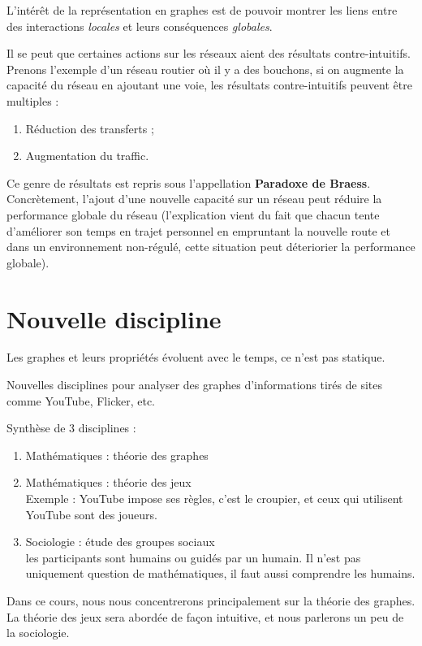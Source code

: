 L'intérêt de la représentation en graphes est de pouvoir montrer les
liens entre des interactions \textit{locales} et leurs conséquences
\textit{globales}. \newline

Il se peut que certaines actions sur les réseaux aient des résultats
contre-intuitifs. Prenons l'exemple d'un réseau routier où il y a des
bouchons, si on augmente la capacité du réseau en ajoutant une voie, les
résultats contre-intuitifs peuvent être multiples :

\begin{enumerate}
    \item Réduction des transferts ;
    \item Augmentation du traffic.
\end{enumerate}

Ce genre de résultats est repris sous l'appellation \textbf{Paradoxe de
Braess}. Concrètement, l'ajout d'une nouvelle capacité sur un réseau
peut réduire la performance globale du réseau (l'explication vient du
fait que chacun tente d'améliorer son temps en trajet personnel en
empruntant la nouvelle route et dans un environnement non-régulé, cette
situation peut déteriorier la performance globale).

\section{Nouvelle discipline}
Les graphes et leurs propriétés évoluent avec le temps, ce n'est pas statique.

Nouvelles disciplines pour analyser des graphes d'informations tirés de sites comme YouTube, Flicker, etc.

Synthèse de 3 disciplines :
\begin{enumerate}

	\item Mathématiques : théorie des graphes
	\item Mathématiques : théorie des jeux\\
		Exemple : YouTube impose ses règles, c'est le croupier, et ceux qui utilisent YouTube sont des joueurs.
	\item Sociologie : étude des groupes sociaux\\
		les participants sont humains ou guidés par un humain. Il n'est pas uniquement question de mathématiques, il faut aussi comprendre les humains.
\end{enumerate}

Dans ce cours, nous nous concentrerons principalement sur la théorie des graphes. La théorie des jeux sera abordée de façon intuitive, et nous parlerons un peu de la sociologie.

